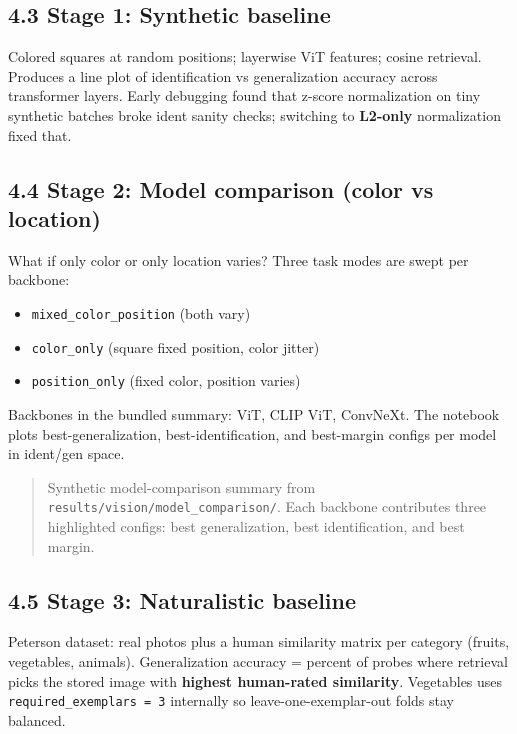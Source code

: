 \documentclass[
  11pt,
]{memoir}
\providecommand{\tightlist}{%
  \setlength{\itemsep}{0pt}\setlength{\parskip}{0pt}}
\begin{document}
\subsection{4.3 Stage 1: Synthetic
baseline}\label{stage-1-synthetic-baseline}

Colored squares at random positions; layerwise ViT features; cosine
retrieval. Produces a line plot of identification vs generalization
accuracy across transformer layers. Early debugging found that z-score
normalization on tiny synthetic batches broke ident sanity checks;
switching to \textbf{L2-only} normalization fixed that.

\subsection{4.4 Stage 2: Model comparison (color vs
location)}\label{stage-2-model-comparison-color-vs-location}

What if only color or only location varies? Three task modes are swept
per backbone:

\begin{itemize}
\tightlist
\item
  \texttt{mixed\_color\_position} (both vary)
\item
  \texttt{color\_only} (square fixed position, color jitter)
\item
  \texttt{position\_only} (fixed color, position varies)
\end{itemize}

Backbones in the bundled summary: ViT, CLIP ViT, ConvNeXt. The notebook
plots best-generalization, best-identification, and best-margin configs
per model in ident/gen space.

\begin{quote}
Synthetic model-comparison summary from
{\ttfamily\nolinkurl{results/vision/model\_comparison/}}. Each backbone contributes
three highlighted configs: best generalization, best identification, and
best margin.
\end{quote}

\subsection{4.5 Stage 3: Naturalistic
baseline}\label{stage-3-naturalistic-baseline}

Peterson dataset: real photos plus a human similarity matrix per
category (fruits, vegetables, animals). Generalization accuracy =
percent of probes where retrieval picks the stored image with
\textbf{highest human-rated similarity}. Vegetables uses
\texttt{required\_exemplars\ =\ 3} internally so leave-one-exemplar-out
folds stay balanced.
\end{document}
